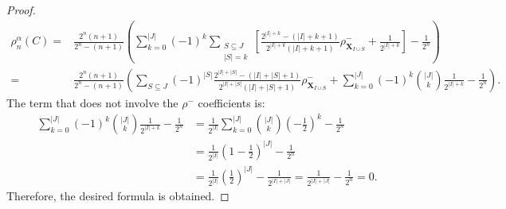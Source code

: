 \documentclass[11pt,a4paper]{article}
\newtheorem{remark}{Remark}
\begin{document}
\begin{proof}
\begin{align*}
\rho_n^\alpha(C)=&\frac{2^n(n+1)}{2^n-(n+1)}\left( \sum_{k=0}^{|J|} (-1)^k \sum_{\substack{S \subseteq J \\ |S|=k}} \left[ \frac{2^{|I|+k}-(|I|+k+1)}{2^{|I|+k}(|I|+k+1)}\rho_{\mathbf{X}_{I \cup S}}^- + \frac{1}{2^{|I|+k}} \right] - \frac{1}{2^n} \right) \\
=&\frac{2^n(n+1)}{2^n-(n+1)}\left( \sum_{S \subseteq J} (-1)^{|S|} \frac{2^{|I|+|S|}-(|I|+|S|+1)}{2^{|I|+|S|}(|I|+|S|+1)}\rho_{\mathbf{X}_{I \cup S}}^- + \sum_{k=0}^{|J|} (-1)^k \binom{|J|}{k} \frac{1}{2^{|I|+k}} - \frac{1}{2^n} \right).
\end{align*}
The term that does not involve the $\rho^-$ coefficients is:
\begin{align*}
\sum_{k=0}^{|J|} (-1)^k \binom{|J|}{k} \frac{1}{2^{|I|+k}} - \frac{1}{2^n} &= \frac{1}{2^{|I|}} \sum_{k=0}^{|J|} \binom{|J|}{k} \left(-\frac{1}{2}\right)^k - \frac{1}{2^n} \\
&= \frac{1}{2^{|I|}} \left(1 - \frac{1}{2}\right)^{|J|} - \frac{1}{2^n} \\
&= \frac{1}{2^{|I|}} \left(\frac{1}{2}\right)^{|J|} - \frac{1}{2^{|I|+|J|}} = \frac{1}{2^{|I|+|J|}} - \frac{1}{2^n} = 0.
\end{align*}
Therefore, the desired formula is obtained.
\end{proof}


\end{document}
